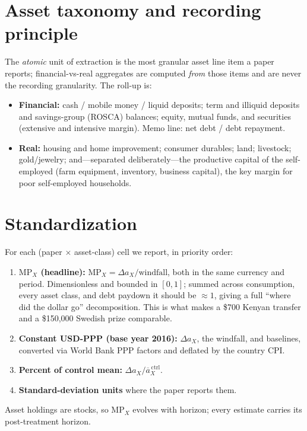 \documentclass[11pt,a4paper]{article}
\newcommand{\mpx}{\mathrm{MP}}
\begin{document}
\section{Asset taxonomy and recording principle}

The \emph{atomic} unit of extraction is the most granular asset line item a paper
reports; financial-vs-real aggregates are computed \emph{from} those items and are
never the recording granularity. The roll-up is:
\begin{itemize}
  \item \textbf{Financial:} cash / mobile money / liquid deposits; term and
  illiquid deposits and savings-group (ROSCA) balances; equity, mutual funds, and
  securities (extensive and intensive margin). Memo line: net debt / debt
  repayment.
  \item \textbf{Real:} housing and home improvement; consumer durables; land;
  livestock; gold/jewelry; and---separated deliberately---the productive capital
  of the self-employed (farm equipment, inventory, business capital), the key
  margin for poor self-employed households.
\end{itemize}

\section{Standardization}

For each (paper $\times$ asset-class) cell we report, in priority order:
\begin{enumerate}
  \item \textbf{$\mpx_X$ (headline):} $\mpx_X = \Delta a_X / \text{windfall}$, both
  in the same currency and period. Dimensionless and bounded in $[0,1]$; summed
  across consumption, every asset class, and debt paydown it should be
  $\approx 1$, giving a full ``where did the dollar go'' decomposition. This is
  what makes a \$700 Kenyan transfer and a \$150{,}000 Swedish prize comparable.
  \item \textbf{Constant USD-PPP (base year 2016):} $\Delta a_X$, the windfall, and
  baselines, converted via World Bank PPP factors and deflated by the country CPI.
  \item \textbf{Percent of control mean:} $\Delta a_X / \overline{a}_X^{\,\text{ctrl}}$.
  \item \textbf{Standard-deviation units} where the paper reports them.
\end{enumerate}
Asset holdings are stocks, so $\mpx_X$ evolves with horizon; every estimate
carries its post-treatment horizon.
\end{document}
